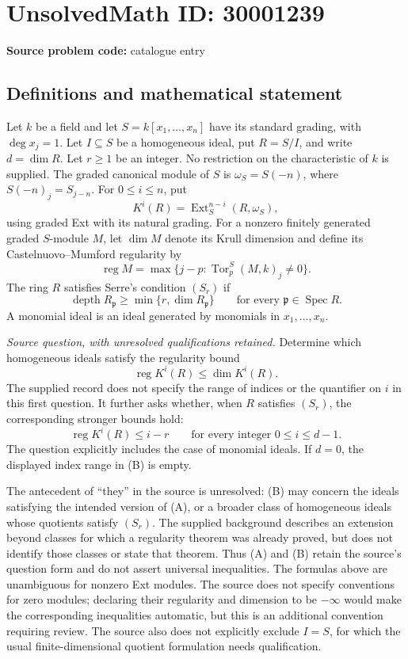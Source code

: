 \documentclass[11pt]{article}
\begin{document}
\section*{UnsolvedMath ID: 30001239}
\textbf{Source problem code:} catalogue entry
\subsection{Definitions and mathematical statement}
Let \(k\) be a field and let \(S=k[x_1,\ldots,x_n]\) have its standard grading, with \(\deg x_j=1\). Let \(I\subseteq S\) be a homogeneous ideal, put \(R=S/I\), and write \(d=\dim R\). Let \(r\geq1\) be an integer. No restriction on the characteristic of \(k\) is supplied. The graded canonical module of \(S\) is \(\omega_S=S(-n)\), where \(S(-n)_j=S_{j-n}\). For \(0\leq i\leq n\), put
\[
K^i(R)=\operatorname{Ext}^{n-i}_S(R,\omega_S),
\]
using graded Ext with its natural grading. For a nonzero finitely generated graded \(S\)-module \(M\), let \(\dim M\) denote its Krull dimension and define its Castelnuovo--Mumford regularity by
\[
\operatorname{reg}M=\max\{j-p:\operatorname{Tor}^S_p(M,k)_j\ne0\}.
\]
The ring \(R\) satisfies Serre's condition \((S_r)\) if
\[
\operatorname{depth}R_{\mathfrak p}\geq\min\{r,\dim R_{\mathfrak p}\}
\qquad\text{for every }\mathfrak p\in\operatorname{Spec}R.
\]
A monomial ideal is an ideal generated by monomials in \(x_1,\ldots,x_n\).

\emph{Source question, with unresolved qualifications retained.} Determine which homogeneous ideals satisfy the regularity bound
\[
\operatorname{reg}K^i(R)\leq\dim K^i(R).
\tag{A}
\]
The supplied record does not specify the range of indices or the quantifier on \(i\) in this first question. It further asks whether, when \(R\) satisfies \((S_r)\), the corresponding stronger bounds hold:
\[
\operatorname{reg}K^i(R)\leq i-r
\qquad\text{for every integer }0\leq i\leq d-1.
\tag{B}
\]
The question explicitly includes the case of monomial ideals. If \(d=0\), the displayed index range in (B) is empty.

The antecedent of ``they'' in the source is unresolved: (B) may concern the ideals satisfying the intended version of (A), or a broader class of homogeneous ideals whose quotients satisfy \((S_r)\). The supplied background describes an extension beyond classes for which a regularity theorem was already proved, but does not identify those classes or state that theorem. Thus (A) and (B) retain the source's question form and do not assert universal inequalities. The formulas above are unambiguous for nonzero Ext modules. The source does not specify conventions for zero modules; declaring their regularity and dimension to be \(-\infty\) would make the corresponding inequalities automatic, but this is an additional convention requiring review. The source also does not explicitly exclude \(I=S\), for which the usual finite-dimensional quotient formulation needs qualification.
\end{document}

